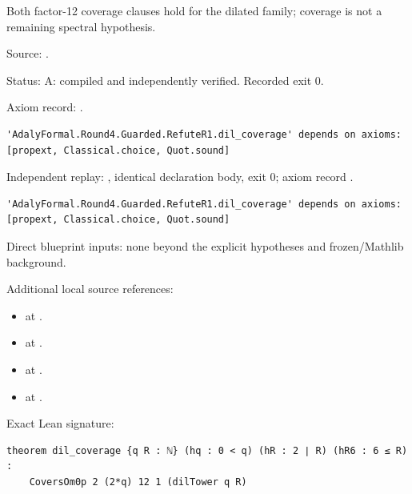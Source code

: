\begin{theorem}[bp-031]
\label{bp-031}
\uses{}
\leanok
Both factor-12 coverage clauses hold for the dilated family; coverage is not a remaining spectral hypothesis.

\par Source: \texttt{}.
\par Status: A: compiled and independently verified. Recorded exit 0.
\par Axiom record: \texttt{}.
\begin{verbatim}
'AdalyFormal.Round4.Guarded.RefuteR1.dil_coverage' depends on axioms: [propext, Classical.choice, Quot.sound]
\end{verbatim}
\par Independent replay: \texttt{}, identical declaration body, exit 0; axiom record \texttt{}.
\begin{verbatim}
'AdalyFormal.Round4.Guarded.RefuteR1.dil_coverage' depends on axioms: [propext, Classical.choice, Quot.sound]
\end{verbatim}
\par Direct blueprint inputs: none beyond the explicit hypotheses and frozen/Mathlib background.
\par Additional local source references:
\begin{itemize}
\item \texttt{} at \texttt{}.
\item \texttt{} at \texttt{}.
\item \texttt{} at \texttt{}.
\item \texttt{} at \texttt{}.
\end{itemize}
\par Exact Lean signature:
\begin{verbatim}
theorem dil_coverage {q R : ℕ} (hq : 0 < q) (hR : 2 ∣ R) (hR6 : 6 ≤ R) :
    CoversOm0p 2 (2*q) 12 1 (dilTower q R)
\end{verbatim}
\end{theorem}

